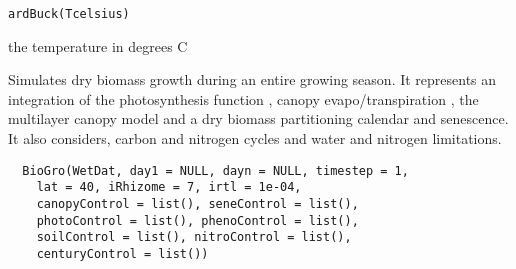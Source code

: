 \documentclass[letterpaper]{book}
\begin{document}
%
\begin{Usage}
\begin{verbatim}
ardBuck(Tcelsius)
\end{verbatim}
\end{Usage}
%
\begin{Arguments}
\begin{ldescription}
\item[\code{Tcelsius}] the temperature in degrees C
\end{ldescription}
\end{Arguments}
%
\begin{Description}\relax
Simulates dry biomass growth during an entire growing
season.  It represents an integration of the
photosynthesis function , canopy
evapo/transpiration , the multilayer
canopy model  and a dry biomass
partitioning calendar and senescence. It also considers,
carbon and nitrogen cycles and water and nitrogen
limitations.
\end{Description}
%
\begin{Usage}
\begin{verbatim}
  BioGro(WetDat, day1 = NULL, dayn = NULL, timestep = 1,
    lat = 40, iRhizome = 7, irtl = 1e-04,
    canopyControl = list(), seneControl = list(),
    photoControl = list(), phenoControl = list(),
    soilControl = list(), nitroControl = list(),
    centuryControl = list())
\end{verbatim}
\end{Usage}
%
\end{document}
